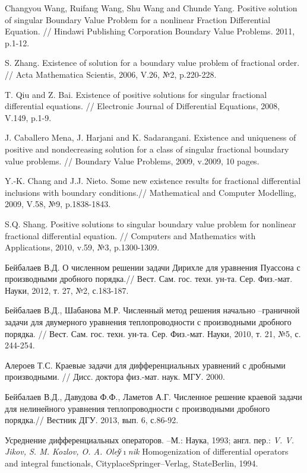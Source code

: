 \begin{thebibliography}{1}
Changyou Wang, Ruifang Wang, Shu Wang and Chunde Yang. Positive solution of singular Boundary Value Problem for a nonlinear Fraction Differential Equation. // Hindawi Publishing Corporation Boundary Value Problems. 2011,  p.1-12.

S. Zhang. Existence of solution for a boundary value problem of fractional order. // Acta Mathematica Scientis, 2006, V.26, №2, p.220-228.


T. Qiu and Z. Bai. Existence of positive solutions for singular fractional differential equations. // Electronic Journal of Differential Equations, 2008, V.149, p.1-9.

J. Caballero Mena, J. Harjani and K. Sadarangani. Existence and uniqueness of positive and nondecreasing solution for a class of singular fractional boundary value problems. // Boundary Value Problems, 2009, v.2009, 10 pages.

Y.-K. Chang and J.J. Nieto. Some new existence results for fractional differential inclusions with boundary conditions.// Mathematical and Computer Modelling, 2009, V.58, №9, p.1838-1843.


S.Q. Shang. Positive solutions to singular boundary value problem for nonlinear fractional differential equation. // Computers and Mathematics with Applications, 2010, v.59, №3, p.1300-1309.

Бейбалаев В.Д. О численном решении задачи Дирихле для уравнения Пуассона с производными дробного порядка.// Вест. Сам. гос. техн. ун-та. Сер. Физ.-мат. Науки, 2012, т. 27, №2, с.183-187.

Бейбалаев  В.Д., Шабанова М.Р. Численный метод решения начально --граничной задачи для двумерного уравнения теплопроводности с производными дробного порядка. // Вест. Сам. гос. техн. ун-та. Сер. Физ.-мат. Науки, 2010, т. 21, №5, с.  244-254.

Алероев Т.С.  Краевые задачи для дифференциальных уравнений с дробными производными. // Дисс. доктора физ.-мат. наук. МГУ. 2000.

Бейбалаев В.Д., Давудова Ф.Ф., Ламетов А.Г. Численное решение краевой задачи для нелинейного уравнения теплопроводности с производными дробного порядка.// Вестник ДГУ. 2013, вып. 6, с.86-92.


Усреднение дифференциальных операторов. --М.: Наука, 1993; англ. пер.: \textit{V. V.  Jikov, S. M. Kozlov, O. A. Oleў$\imath$nik }Homogenization of differential operators and integral functionals, CityplaceSpringer--Verlag, StateBerlin, 1994.


\end{thebibliography}
